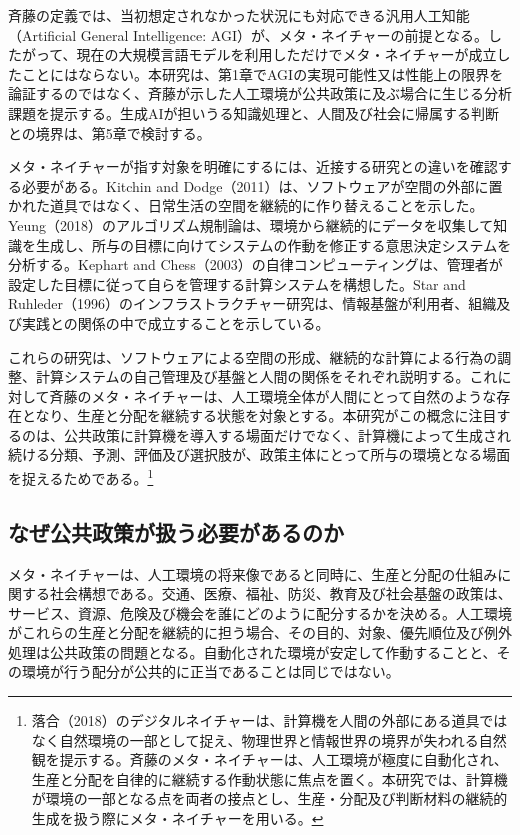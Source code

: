 斉藤の定義では、当初想定されなかった状況にも対応できる汎用人工知能（Artificial General Intelligence: AGI）が、メタ・ネイチャーの前提となる\cite[p. 361]{saito2025metanature}。したがって、現在の大規模言語モデルを利用しただけでメタ・ネイチャーが成立したことにはならない。本研究は、第1章でAGIの実現可能性又は性能上の限界を論証するのではなく、斉藤が示した人工環境が公共政策に及ぶ場合に生じる分析課題を提示する。生成AIが担いうる知識処理と、人間及び社会に帰属する判断との境界は、第5章で検討する。

メタ・ネイチャーが指す対象を明確にするには、近接する研究との違いを確認する必要がある。Kitchin and Dodge（2011）は、ソフトウェアが空間の外部に置かれた道具ではなく、日常生活の空間を継続的に作り替えることを示した\cite{kitchin2011codespace}。Yeung（2018）のアルゴリズム規制論は、環境から継続的にデータを収集して知識を生成し、所与の目標に向けてシステムの作動を修正する意思決定システムを分析する\cite{yeung2018algorithmicregulation}。Kephart and Chess（2003）の自律コンピューティングは、管理者が設定した目標に従って自らを管理する計算システムを構想した\cite{kephart2003autonomic}。Star and Ruhleder（1996）のインフラストラクチャー研究は、情報基盤が利用者、組織及び実践との関係の中で成立することを示している\cite{star1996infrastructure}。

これらの研究は、ソフトウェアによる空間の形成、継続的な計算による行為の調整、計算システムの自己管理及び基盤と人間の関係をそれぞれ説明する。これに対して斉藤のメタ・ネイチャーは、人工環境全体が人間にとって自然のような存在となり、生産と分配を継続する状態を対象とする。本研究がこの概念に注目するのは、公共政策に計算機を導入する場面だけでなく、計算機によって生成され続ける分類、予測、評価及び選択肢が、政策主体にとって所与の環境となる場面を捉えるためである。\footnote{落合（2018）のデジタルネイチャーは、計算機を人間の外部にある道具ではなく自然環境の一部として捉え、物理世界と情報世界の境界が失われる自然観を提示する\cite{ochiai2018digitalnature}。斉藤のメタ・ネイチャーは、人工環境が極度に自動化され、生産と分配を自律的に継続する作動状態に焦点を置く。本研究では、計算機が環境の一部となる点を両者の接点とし、生産・分配及び判断材料の継続的生成を扱う際にメタ・ネイチャーを用いる。}

\subsection{なぜ公共政策が扱う必要があるのか}
\label{subsec:intro_public_policy_relevance}

メタ・ネイチャーは、人工環境の将来像であると同時に、生産と分配の仕組みに関する社会構想である。交通、医療、福祉、防災、教育及び社会基盤の政策は、サービス、資源、危険及び機会を誰にどのように配分するかを決める。人工環境がこれらの生産と分配を継続的に担う場合、その目的、対象、優先順位及び例外処理は公共政策の問題となる。自動化された環境が安定して作動することと、その環境が行う配分が公共的に正当であることは同じではない。

